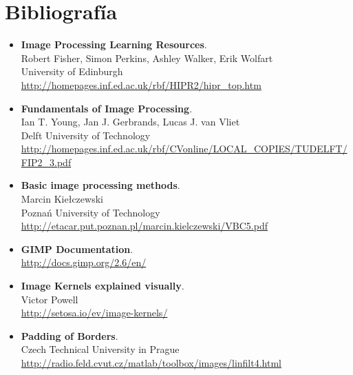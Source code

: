 \documentclass[a4paper, 11pt]{article} %
\begin{document}

\section*{Bibliografía}

	\begin{itemize} 
		\item \textbf{Image Processing Learning Resources}.\\
		Robert Fisher, Simon Perkins, Ashley Walker, Erik Wolfart\\
		University of Edinburgh\\
		{\footnotesize \url{http://homepages.inf.ed.ac.uk/rbf/HIPR2/hipr_top.htm}}\\
		
		\item \textbf{Fundamentals of Image Processing}.\\		
		Ian T. Young, Jan J. Gerbrands, Lucas J. van Vliet\\
		Delft University of Technology\\
		{\footnotesize \url{http://homepages.inf.ed.ac.uk/rbf/CVonline/LOCAL_COPIES/TUDELFT/FIP2_3.pdf}}\\
		
		\item \textbf{Basic image processing methods}.\\		
		Marcin Kiełczewski\\
		Poznań University of Technology\\
		{\footnotesize \url{http://etacar.put.poznan.pl/marcin.kielczewski/VBC5.pdf}}\\
		
		\item \textbf{GIMP Documentation}.\\
		{\footnotesize \url{http://docs.gimp.org/2.6/en/}}\\
		
		\item \textbf{Image Kernels explained visually}.\\
		Victor Powell\\
		{\footnotesize \url{http://setosa.io/ev/image-kernels/}}\\
		
		\item \textbf{Padding of Borders}.\\
		Czech Technical University in Prague\\
		{\footnotesize \url{http://radio.feld.cvut.cz/matlab/toolbox/images/linfilt4.html}}\\ 
	\end{itemize}
\pagebreak
\end{document}
